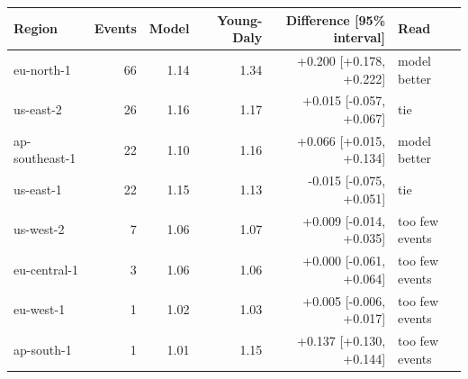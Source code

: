 \begin{tabular}{lrrrrl}
\toprule
Region & Events & Model & Young-Daly & Difference [95\% interval] & Read \\
\midrule
eu-north-1 & 66 & 1.14 & 1.34 & +0.200 [+0.178, +0.222] & model better \\
us-east-2 & 26 & 1.16 & 1.17 & +0.015 [-0.057, +0.067] & tie \\
ap-southeast-1 & 22 & 1.10 & 1.16 & +0.066 [+0.015, +0.134] & model better \\
us-east-1 & 22 & 1.15 & 1.13 & -0.015 [-0.075, +0.051] & tie \\
us-west-2 & 7 & 1.06 & 1.07 & +0.009 [-0.014, +0.035] & too few events \\
eu-central-1 & 3 & 1.06 & 1.06 & +0.000 [-0.061, +0.064] & too few events \\
eu-west-1 & 1 & 1.02 & 1.03 & +0.005 [-0.006, +0.017] & too few events \\
ap-south-1 & 1 & 1.01 & 1.15 & +0.137 [+0.130, +0.144] & too few events \\
\bottomrule
\end{tabular}
